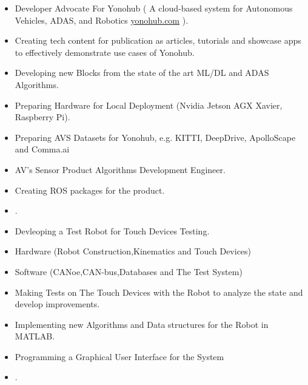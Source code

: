 \documentclass[10pt,a4paper,ragged2e]{altacv}
\begin{document}
\divider

\begin{itemize}
\item Developer Advocate For Yonohub ( A cloud-based system for  Autonomous Vehicles, ADAS, and Robotics  \href{https://yonohub.com/}{yonohub.com} ). 
\item Creating tech content for publication as articles, tutorials and showcase apps to effectively demonstrate use cases of Yonohub.
\item Developing new Blocks from the state of the art ML/DL and ADAS Algorithms.
\item Preparing Hardware for Local Deployment (Nvidia Jetson AGX Xavier, Raspberry Pi).
\item Preparing AVS Datasets for Yonohub, e.g. KITTI, DeepDrive, ApolloScape and Comma.ai
\item AV's Sensor Product Algorithms Development Engineer.
\item Creating ROS packages for the product.
	\item {}.

\end{itemize}

\divider

\begin{itemize}
\item Devleoping a Test Robot for Touch Devices Testing. 
\item Hardware (Robot Construction,Kinematics and Touch Devices)
\item Software (CANoe,CAN-bus,Databases and The Test System)
\item Making Tests on The Touch Devices with the Robot to analyze the state
and develop improvements.
\item  Implementing new Algorithms and Data structures for the Robot in MATLAB.
\item Programming a Graphical User Interface for the System
\item {}.
\end{itemize}
\divider





\clearpage
\end{document}
